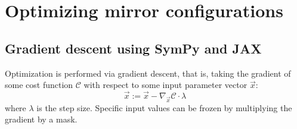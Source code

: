 %
%
%
%

\section{Optimizing mirror configurations}

\subsection{Gradient descent using SymPy and JAX}

Optimization is performed via gradient descent, that is, taking the gradient of some cost function $\mathcal{C}$ with respect to some input parameter vector $\vec{x}$:
\begin{equation}
   \vec{x} := \vec{x} - \nabla_{\vec{x}}\mathcal{C} \cdot \lambda
\end{equation}
where $\lambda$ is the step size. Specific input values can be frozen by multiplying the gradient by a mask. 

